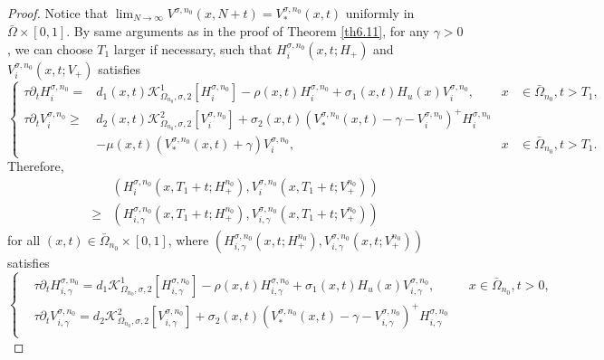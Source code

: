\documentclass[11pt,reqno]{amsart}
\numberwithin{equation}{section}
\begin{document}
\begin{proof}
Notice that $\lim_{N \to \infty} V^{\sigma,n_{0}}(x,N+t) = V_{*}^{\sigma,n_{0}}(x,t)$ uniformly in $\bar{\Omega} \times [0,1]$. By same arguments as in the proof of Theorem \ref{th6.11}, for any $\gamma>0$, we can choose $T_{1}$ larger if necessary, such that $H_{i}^{\sigma,n_{0}}(x,t;H_{+})$ and $V_{i}^{\sigma,n_{0}}(x,t;V_{+})$ satisfies
\begin{equation*}
\left\{
\begin{aligned}
 \tau \partial_{t} H_{i}^{\sigma,n_{0}}
=&d_{1}(x,t) \mathcal{K}^{1}_{\Omega_{n_{0}},\sigma,2}[H_{i}^{\sigma,n_{0}}]-\rho(x,t)H_{i}^{\sigma,n_{0}}+\sigma_{1}(x,t)H_{u}(x)V_{i}^{\sigma,n_{0}}, &x&\in\bar\Omega_{n_{0}}, t>T_{1},
\\
 \tau \partial_{t} V_{i}^{\sigma,n_{0}}
\geq &d_{2}(x,t) \mathcal{K}^{2}_{\Omega_{n_{0}},\sigma,2}[V_{i}^{\sigma,n_{0}}]+\sigma_{2}(x,t)(V_{*}^{\sigma,n_{0}}(x,t)-\gamma-V_{i}^{\sigma,n_{0}})^{+}H_{i}^{\sigma,n_{0}}
\\
\quad &-\mu(x,t)(V_{*}^{\sigma,n_{0}}(x,t)+\gamma)V_{i}^{\sigma,n_{0}}, &x&\in\bar\Omega_{n_{0}}, t>T_{1}.
\end{aligned}
\right.
\end{equation*}
%
%
Therefore,
\begin{equation}\label{4-26}
\begin{aligned}
&\left(H_{i}^{\sigma,n_{0}}(x,T_{1}+t;H_{+}^{n_{0}}), V_{i}^{\sigma,n_{0}}(x,T_{1}+t;V_{+}^{n_{0}})\right)\\
\geq&
\left(H_{i,\gamma}^{\sigma,n_{0}}(x,T_{1}+t;H_{+}^{n_{0}}), V_{i,\gamma}^{\sigma, n_{0}}(x,T_{1}+t;V_{+}^{n_{0}})\right)
\end{aligned}
\end{equation}
for all $(x,t)\in\bar{\Omega}_{n_{0}}\times[0,1]$, where $\left(H_{i,\gamma}^{\sigma,n_{0}}(x,t;H_{+}^{n_{0}}), V_{i,\gamma}^{\sigma,n_{0}}(x,t;V_{+}^{n_{0}})\right)$ satisfies
%
%
\begin{equation*}
\left\{
\begin{aligned}
 &\tau \partial_{t} H_{i,\gamma}^{\sigma,n_{0}}
=d_{1} \mathcal{K}^{1}_{\Omega_{n_{0}},\sigma,2}[H_{i,\gamma}^{\sigma,n_{0}}]-\rho(x,t)H_{i,\gamma}^{\sigma,n_{0}} + \sigma_{1}(x,t)H_{u}(x)V_{i,\gamma}^{\sigma,n_{0}},\quad &&x\in\bar\Omega_{n_{0}}, t>0,
\\
 &\tau \partial_{t} V_{i,\gamma}^{\sigma, n_{0}}
= d_{2}\mathcal{K}^{2}_{\Omega_{n_{0}},\sigma,2}[V_{i,\gamma}^{\sigma,n_{0}}]+\sigma_{2}(x,t)(V_{*}^{\sigma, n_{0}}(x,t)-\gamma-V_{i,\gamma}^{\sigma,n_{0}})^{+}H_{i,\gamma}^{\sigma,n_{0}}
\\

\end{aligned}
\end{equation*}
\end{proof}
\end{document}
